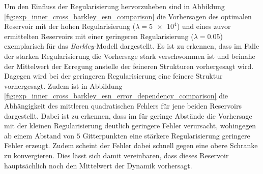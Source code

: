 Um den Einfluss der Regularisierung hervorzuheben sind in Abbildung \ref{fig:exp_inner_cross_barkley_esn_comparison} die Vorhersagen des optimalen Reservoir mit der hohen Regularisierung ($\lambda=\num{5e4}$) und eines zuvor ermittelten Reservoirs mit einer geringeren Regularisierung ($\lambda=0.05$) exemplarisch für das \textit{Barkley}-Modell dargestellt. Es ist zu erkennen, dass im Falle der starken Regularisierung die Vorhersage stark verschwommen ist und beinahe der Mittelwert der Erregung anstelle der feineren Strukturen vorhergesagt wird. Dagegen wird bei der geringeren Regularisierung eine feinere Struktur vorhergesagt. 
Zudem ist in Abbildung \ref{fig:exp_inner_cross_barkley_esn_error_dependency_comparison} die Abhängigkeit des mittleren quadratischen Fehlers für jene beiden Reservoirs dargestellt. Dabei ist zu erkennen, dass im für geringe Abstände die Vorhersage mit der kleinen Regularisierung deutlich geringere Fehler verursacht, wohingegen ab einem Abstand von $5$ Gitterpunkten eine stärkere Regularisierung geringere Fehler erzeugt. Zudem scheint der Fehler dabei schnell gegen eine obere Schranke zu konvergieren. Dies lässt sich damit vereinbaren, dass dieses Reservoir hauptsächlich noch den Mittelwert der Dynamik vorhersagt.

